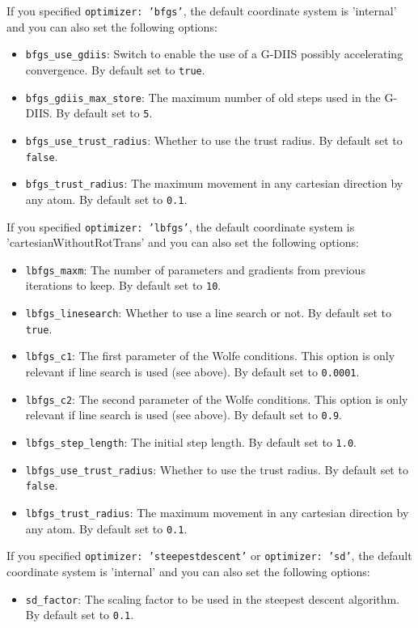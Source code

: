 \documentclass[]{tufte-book}
\begin{document}
If you specified \texttt{optimizer: 'bfgs'}, the default coordinate system is 'internal'
and you can also set the following options:
\begin{itemize}
\item \texttt{bfgs\_use\_gdiis}: Switch to enable the use of a G-DIIS possibly accelerating convergence. By default set to
\texttt{true}.
\item \texttt{bfgs\_gdiis\_max\_store}: The maximum number of old steps used in the G-DIIS. By default set to \texttt{5}.
\item \texttt{bfgs\_use\_trust\_radius}: Whether to use the trust radius. By default set to \texttt{false}.
\item \texttt{bfgs\_trust\_radius}: The maximum movement in any cartesian direction by any atom. By default set to \texttt{0.1}.
\end{itemize}

If you specified \texttt{optimizer: 'lbfgs'}, the default coordinate system is 'cartesianWithoutRotTrans'
and you can also set the following options:
\begin{itemize}
\item \texttt{lbfgs\_maxm}: The number of parameters and gradients from previous iterations to keep. By default set to
\texttt{10}.
\item \texttt{lbfgs\_linesearch}: Whether to use a line search or not. By default set to \texttt{true}.
\item \texttt{lbfgs\_c1}: The first parameter of the Wolfe conditions. This option is only relevant if line search is
used (see above). By default set to \texttt{0.0001}.
\item \texttt{lbfgs\_c2}:  The second parameter of the Wolfe conditions. This option is only relevant if line search is
used (see above). By default set to \texttt{0.9}.
\item \texttt{lbfgs\_step\_length}: The initial step length. By default set to \texttt{1.0}.
\item \texttt{lbfgs\_use\_trust\_radius}: Whether to use the trust radius. By default set to \texttt{false}.
\item \texttt{lbfgs\_trust\_radius}: The maximum movement in any cartesian direction by any atom. By default set to \texttt{0.1}.
\end{itemize}

If you specified \texttt{optimizer: 'steepestdescent'} or \texttt{optimizer: 'sd'}, the default coordinate system is 'internal'
and you can also set the following options:
\begin{itemize}
\item \texttt{sd\_factor}: The scaling factor to be used in the steepest descent algorithm. By default set to \texttt{0.1}.
\end{itemize}
\end{document}

